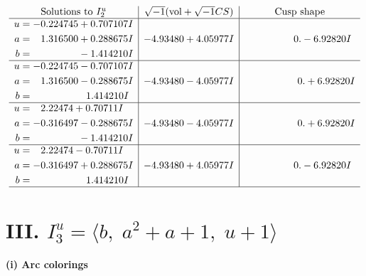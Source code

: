 \documentclass[1p]{elsarticle_modified}
\theoremstyle{definition}
\newcommand{\I}{\sqrt{-1}}
\begin{document}
$$\begin{array}{c|c|c}  
\text{Solutions to }I^u_{2}& \I (\text{vol} + \sqrt{-1}CS) & \text{Cusp shape}\\
 \hline 
\begin{aligned}
u &= -0.224745 + 0.707107 I \\
a &= \phantom{-}1.316500 + 0.288675 I \\
b &= \phantom{-0.000000 } -1.414210 I\end{aligned}
 & -4.93480 + 4.05977 I & \phantom{-0.000000 } 0. - 6.92820 I \\ \hline\begin{aligned}
u &= -0.224745 - 0.707107 I \\
a &= \phantom{-}1.316500 - 0.288675 I \\
b &= \phantom{-0.000000 -}1.414210 I\end{aligned}
 & -4.93480 - 4.05977 I & \phantom{-0.000000 -}0. + 6.92820 I \\ \hline\begin{aligned}
u &= \phantom{-}2.22474 + 0.70711 I \\
a &= -0.316497 - 0.288675 I \\
b &= \phantom{-0.000000 } -1.414210 I\end{aligned}
 & -4.93480 - 4.05977 I & \phantom{-0.000000 -}0. + 6.92820 I \\ \hline\begin{aligned}
u &= \phantom{-}2.22474 - 0.70711 I \\
a &= -0.316497 + 0.288675 I \\
b &= \phantom{-0.000000 -}1.414210 I\end{aligned}
 & -4.93480 + 4.05977 I & \phantom{-0.000000 } 0. - 6.92820 I\\
 \hline 
 \end{array}$$\newpage\newpage\renewcommand{\arraystretch}{1}
\centering \section*{III. $I^u_{3}= \langle b,\;a^2+a+1,\;u+1 \rangle$}
\flushleft \textbf{(i) Arc colorings}\\
\end{document}
